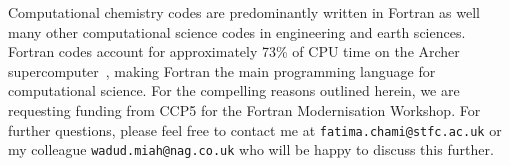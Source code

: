 \documentclass[12pt]{article}
\begin{document}
Computational chemistry codes are predominantly written in Fortran as well many other computational science codes in
engineering and earth sciences. Fortran codes account for approximately 73\% of CPU time on the Archer
supercomputer~\cite{archer:usage}, making Fortran the main programming language for computational science. For the compelling
reasons outlined herein, we are requesting funding from CCP5 for the Fortran Modernisation Workshop. For further questions,
please feel free to contact me at \texttt{fatima.chami@stfc.ac.uk} or my colleague \texttt{wadud.miah@nag.co.uk} who
will be happy to discuss this further. 
%


%
\end{document}
